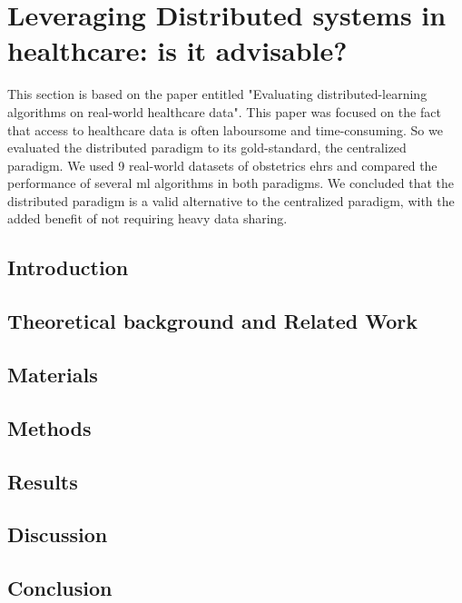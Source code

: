 \section{Leveraging Distributed systems in healthcare: is it advisable?}\label{subsec:distributed}
This section is based on the paper entitled "Evaluating distributed-learning algorithms on real-world healthcare data". This paper was focused on the fact that access to healthcare data is often laboursome and time-consuming. So we evaluated the distributed paradigm to its gold-standard, the centralized paradigm. We used 9 real-world datasets of obstetrics \acp{ehr} and compared the performance of several \ac{ml} algorithms in both paradigms. We concluded that the distributed paradigm is a valid alternative to the centralized paradigm, with the added benefit of not requiring heavy data sharing.

\subsection{Introduction}

\subsection{Theoretical background and Related Work}

\subsection{Materials}

\subsection{Methods}

\subsection{Results}

\subsection{Discussion}

\subsection{Conclusion}



